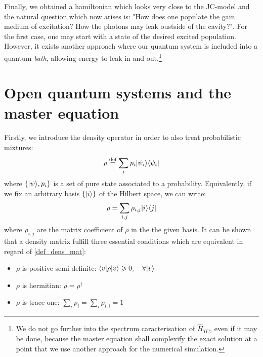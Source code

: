 \documentclass[10pt]{report}
\DeclarePairedDelimiter\bra{\langle}{\rvert}
\DeclarePairedDelimiter\ket{\lvert}{\rangle}
\begin{document}
Finally, we obtained a hamiltonian which looks very close to the JC-model and the natural question which now arises is: "How does one populate the gain medium of excitation? How the photons may leak oustside of the cavity?". For the first case, one may start with a state of the desired excited population. However, it exists another approach where our quantum system is included into a quantum \textit{bath}, allowing energy to leak in and out.\footnote{We do not go further into the spectrum caracterisation of $\hat{H}_{TC}$, even if it may be done, because the master equation shall complexify the exact solution at a point that we use another approach for the numerical simulation.}

\section{Open quantum systems and the master equation}
\paragraph{}

Firstly, we introduce the density operator in order to also treat probabilistic mixtures:
\begin{equation}
\label{def_dens_mat}
\rho \stackrel{\text{def}}{=} \sum_i p_i \ket{\psi_i}\bra{\psi_i}
\end{equation}
where $\left\lbrace \ket{\psi}, p_i \right\rbrace$ is a set of pure state associated to a probability. Equivalently, if we fix an arbitrary basis $\left\lbrace \ket{i} \right\rbrace$ of the Hilbert space, we can write:
\begin{equation}
\label{deftwo_dens_mat}
\rho = \sum_{i,j} \rho_{i,j} \ket{i}\bra{j}
\end{equation}
where $\rho_{i,j}$ are the matrix coefficient of $\rho$ in the the given basis. It can be shown that a density matrix fulfill three essential conditions which are equivalent in regard of \eqref{def_dens_mat}:
\begin{itemize}
	\item $\rho$ is positive semi-definite: $\bra{v} \rho \ket{v} \geqslant 0, \quad \forall \ket{v}$
	\item $\rho$ is hermitian: $\rho = \rho^\dagger$
	\item $\rho$ is trace one: $\sum_i p_i = \sum_i \rho_{i, i} = 1$
\end{itemize}
\end{document}
